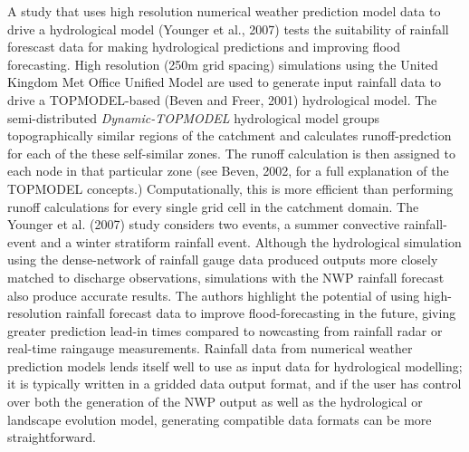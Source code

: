A study that uses high resolution numerical weather prediction model data  to drive a hydrological model (Younger et al., 2007) tests the suitability of rainfall forescast data for making hydrological predictions and improving flood forecasting. High resolution (250m grid spacing) simulations using the United Kingdom Met Office Unified Model are used to generate input rainfall data to drive a TOPMODEL-based (Beven and Freer, 2001) hydrological model. The semi-distributed \textit{Dynamic-TOPMODEL} hydrological model groups topographically similar regions of the catchment and calculates runoff-predction for each of the these self-similar zones. The runoff calculation is then assigned to each node in that particular zone (see Beven, 2002, for a full explanation of the TOPMODEL concepts.) Computationally, this is more efficient than performing runoff calculations for every single grid cell in the catchment domain.
The Younger et al. (2007) study considers two events, a summer convective rainfall-event and a winter stratiform rainfall event. Although the hydrological simulation using the dense-network of rainfall gauge data produced outputs more closely matched to discharge observations, simulations with the NWP rainfall forecast also produce accurate results. The authors highlight the potential of using high-resolution rainfall forecast data to improve flood-forecasting in the future, giving greater prediction lead-in times compared to nowcasting from rainfall radar or real-time raingauge measurements. Rainfall data from numerical weather prediction models lends itself well to use as input data for hydrological modelling; it is typically written in a gridded data output format, and if the user has control over both the generation of the NWP output as well as the hydrological or landscape evolution model, generating compatible data formats can be more straightforward.

